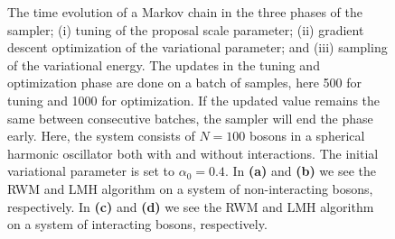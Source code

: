 \begin{figure}[!htb]
\centering
{}
\qquad
{}
\qquad
{}
\qquad
{}
\caption{The time evolution of a Markov chain in the three phases of the sampler; (i) tuning of the proposal scale parameter; (ii) gradient descent optimization of the variational parameter; and (iii) sampling of the variational energy. The updates in the tuning and optimization phase are done on a batch of samples, here 500 for tuning and 1000 for optimization. If the updated value remains the same between consecutive batches, the sampler will end the phase early. Here, the system consists of $N=100$ bosons in a spherical harmonic oscillator both with and without interactions. The initial variational parameter is set to $\alpha_0 = 0.4$. In \textbf{(a)} and \textbf{(b)} we see the RWM and LMH algorithm on a system of non-interacting bosons, respectively. In \textbf{(c)} and \textbf{(d)} we see the RWM and LMH algorithm on a system of interacting bosons, respectively.}
\label{fig:trace_phase}
\end{figure}

